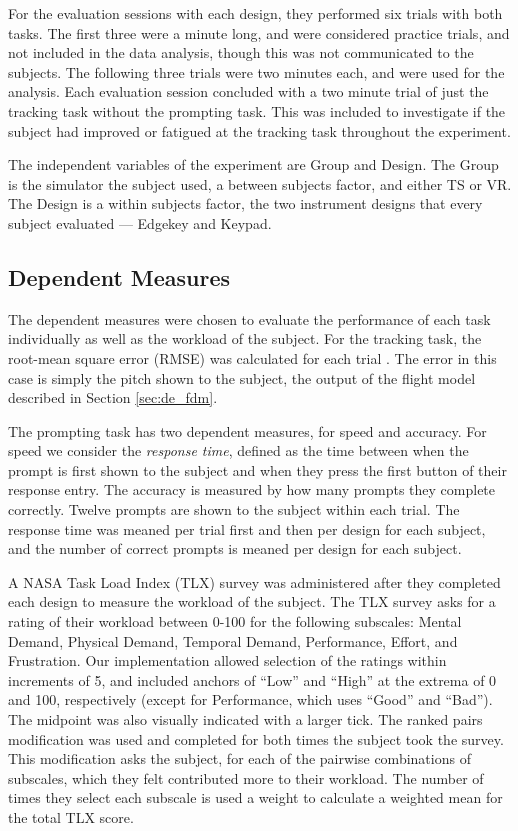 For the evaluation sessions with each design, they performed six trials with both tasks.
The first three were a minute long, and were considered practice trials, and not included in the data analysis, though this was not communicated to the subjects.
The following three trials were two minutes each, and were used for the analysis.
Each evaluation session concluded with a two minute trial of just the tracking task without the prompting task.
This was included to investigate if the subject had improved or fatigued at the tracking task throughout the experiment.

The independent variables of the experiment are Group and Design.
The Group is the simulator the subject used, a between subjects factor, and either TS or VR.
The Design is a within subjects factor, the two instrument designs that every subject evaluated --- Edgekey and Keypad.

\subsection{Dependent Measures}
\label{sec:de_dependent}

The dependent measures were chosen to evaluate the performance of each task individually as well as the workload of the subject.
For the tracking task, the root-mean square error (RMSE) was calculated for each trial \citep{harris_human_2011}.
The error in this case is simply the pitch shown to the subject, the output of the flight model described in Section \ref{sec:de_fdm}.

The prompting task has two dependent measures, for speed and accuracy.
For speed we consider the \textit{response time}, defined as the time between when the prompt is first shown to the subject and when they press the first button of their response entry.
The accuracy is measured by how many prompts they complete correctly.
Twelve prompts are shown to the subject within each trial.
The response time was meaned per trial first and then per design for each subject, and the number of correct prompts is meaned per design for each subject.

A NASA Task Load Index (TLX) survey was administered after they completed each design to measure the workload of the subject.
The TLX survey asks for a rating of their workload between 0-100 for the following subscales: Mental Demand, Physical Demand, Temporal Demand, Performance, Effort, and Frustration.
Our implementation allowed selection of the ratings within increments of 5, and included anchors of ``Low'' and ``High'' at the extrema of 0 and 100, respectively (except for Performance, which uses ``Good'' and ``Bad'').
The midpoint was also visually indicated with a larger tick.
The ranked pairs modification was used and completed for both times the subject took the survey.
This modification asks the subject, for each of the pairwise combinations of subscales, which they felt contributed more to their workload.
The number of times they select each subscale is used a weight to calculate a weighted mean for the total TLX score.

